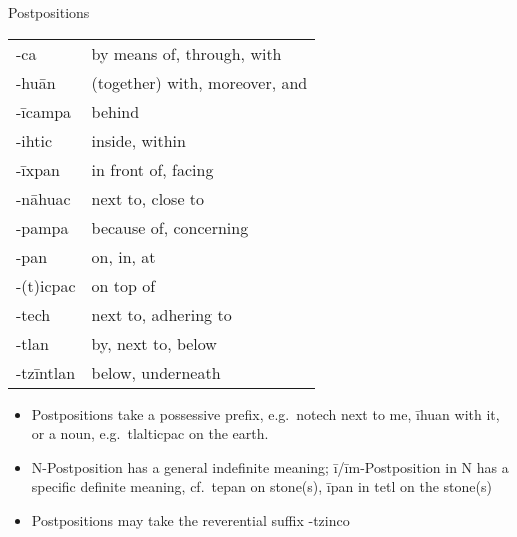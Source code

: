 \documentclass[12pt]{beamer}
\newcommand{\nah}[1]{\textcolor{nahgrn}{#1}}
\newcommand{\trs}[1]{\textcolor{nahblu}{#1}}
\begin{document}
\begin{frame}
\begin{columns}[t]
\begin{column}{.23\linewidth}
\begin{block}{Postpositions}
\begin{tabular}{ll}
          \nah{-ca}       & \trs{by means of, through, with}     \\
          \nah{-huān}     & \trs{(together) with, moreover, and} \\
          \nah{-īcampa}   & \trs{behind}                         \\
          \nah{-ihtic}    & \trs{inside, within}                 \\
          \nah{-īxpan}    & \trs{in front of, facing}            \\
          \nah{-nāhuac}   & \trs{next to, close to}              \\
          \nah{-pampa}    & \trs{because of, concerning}         \\
          \nah{-pan}      & \trs{on, in, at}                     \\
          \nah{-(t)icpac} & \trs{on top of}                      \\
          \nah{-tech}     & \trs{next to, adhering to}           \\
          \nah{-tlan}     & \trs{by, next to, below}             \\
          \nah{-tzīntlan} & \trs{below, underneath}              \\
        \end{tabular}%
        \begin{itemize}
          \item Postpositions take a possessive prefix, e.g.~\nah{notech} \trs{next to me}, \nah{īhuan} \trs{with it}, or a noun, e.g.~\nah{tlalticpac} \trs{on the earth}.
          \item         N-Postposition has a general indefinite meaning; \nah{ī/īm}-Postposition \nah{in} N has a specific definite meaning, cf.~\nah{tepan} \trs{on stone(s)}, \nah{īpan in tetl} \trs{on the stone(s)}
          \item Postpositions may take the reverential suffix \nah{-tzinco}
        \end{itemize}
      \end{block}
    \end{column}
  \end{columns}
\end{frame}
\end{document}
